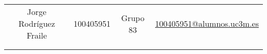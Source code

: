 \documentclass[12pt, spanish, pdftex]{UC3M_document}
\author{Jorge Rodríguez Fraile}
\begin{document}
\begin{titlepage}

	\begin{table}[b]
		\centering
		\begin{tabular}{ cccc }
			\large Jorge Rodríguez Fraile & \large 100405951 & \large Grupo 83 & \href{mailto:100405951@alumnos.uc3m.es}{\large 100405951@alumnos.uc3m.es} \\
			                              &                  &                 &                                                                           \\
			                              &                  &                 &                                                                           \\
		\end{tabular}
	\end{table}

\end{titlepage}

\newpage
\end{document}
